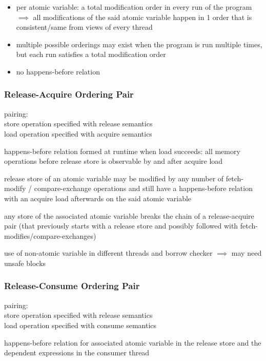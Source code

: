 \documentclass[8pt]{extarticle}
\begin{document}
\begin{multicols*}{2}
    \begin{itemize}
    \item per atomic variable: a total modification order in every run of the program $\implies$ all modifications of the said atomic variable happen in 1 order that is consistent/same from views of every thread
    \item multiple possible orderings may exist when the program is run multiple times, but each run satisfies a total modification order
    \item no happens-before relation
    \end{itemize}

    \subsubsection{Release-Acquire Ordering Pair}
    pairing:\\
    store operation specified with release semantics\\
    load operation specified with acquire semantics

    happens-before relation formed at runtime when load succeeds: all memory operations before release store is observable by and after acquire load

    release store of an atomic variable may be modified by any number of fetch-modify / compare-exchange operations and still have a happens-before relation with an acquire load afterwards on the said atomic variable

    any store of the associated atomic variable breaks the chain of a release-acquire pair (that previously starts with a release store and possibly followed with fetch-modifies/compare-exchanges)

    use of non-atomic variable in different threads and borrow checker $\implies$ may need unsafe blocks
    
    \subsubsection{Release-Consume Ordering Pair}

    pairing:\\
    store operation specified with release semantics\\
    load operation specified with consume semantics

    happens-before relation for associated atomic variable in the release store and the dependent expressions in the consumer thread


\end{multicols*}
\end{document}
